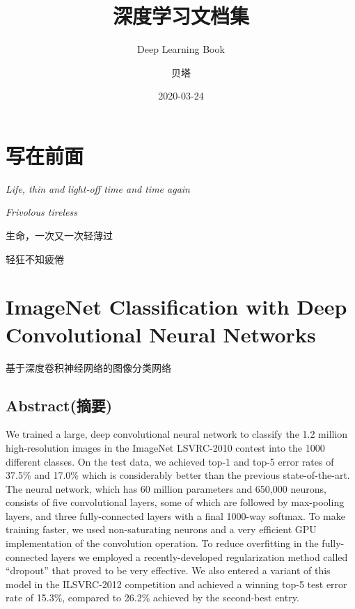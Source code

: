 \documentclass[12pt,a4paper,UTF8,twoside]{book}
\title{深度学习文档集}
\subtitle{Deep Learning Book}
\author{贝塔}
\date{2020-03-24}
\begin{document}





{
\setcounter{tocdepth}{2}
\tableofcontents
}

\hypertarget{ux5199ux5728ux524dux9762}{%
\chapter{写在前面}\label{ux5199ux5728ux524dux9762}}

\emph{Life, thin and light-off time and time again}

\emph{Frivolous tireless}

生命，一次又一次轻薄过

轻狂不知疲倦

\hypertarget{Alexnet}{%
\chapter{ImageNet Classification with Deep Convolutional Neural Networks}\label{Alexnet}}

基于深度卷积神经网络的图像分类网络

\hypertarget{abstractux6458ux8981}{%
\section{Abstract(摘要)}\label{abstractux6458ux8981}}

We trained a large, deep convolutional neural network to classify the 1.2 million high-resolution images in the ImageNet LSVRC-2010 contest into the 1000 different classes. On the test data, we achieved top-1 and top-5 error rates of 37.5\% and 17.0\% which is considerably better than the previous state-of-the-art. The neural network, which has 60 million parameters and 650,000 neurons, consists of five convolutional layers, some of which are followed by max-pooling layers, and three fully-connected layers with a final 1000-way softmax. To make training faster, we used non-saturating neurons and a very efficient GPU implementation of the convolution operation. To reduce overfitting in the fully-connected layers we employed a recently-developed regularization method called ``dropout'' that proved to be very effective. We also entered a variant of this model in the ILSVRC-2012 competition and achieved a winning top-5 test error rate of 15.3\%, compared to 26.2\% achieved by the second-best entry.
\end{document}
